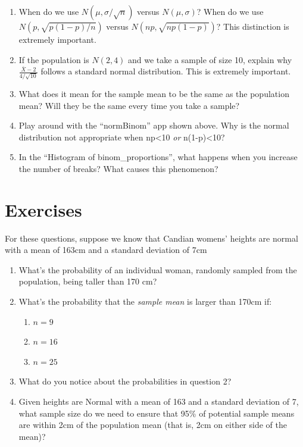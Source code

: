 \documentclass[
  letterpaper,
  DIV=11,
  numbers=noendperiod,
  oneside]{scrreprt}
\providecommand{\tightlist}{%
  \setlength{\itemsep}{0pt}\setlength{\parskip}{0pt}}\usepackage{longtable,booktabs,array}
\begin{document}
\begin{enumerate}
\def\labelenumi{\arabic{enumi}.}
\tightlist
\item
  When do we use \(N(\mu, \sigma/\sqrt{n})\) versus \(N(\mu, \sigma)\)?
  When do we use \(N(p, \sqrt{p(1-p)/n})\) versus
  \(N(np, \sqrt{np(1-p)})\)? This distinction is extremely important.
\item
  If the population is \(N(2,4)\) and we take a sample of size 10,
  explain why \(\frac{\bar X - 2}{4/\sqrt{10}}\) follows a standard
  normal distribution. This is extremely important.
\item
  What does it mean for the sample mean to be the same as the population
  mean? Will they be the same every time you take a sample?
\item
  Play around with the ``normBinom'' app shown above. Why is the normal
  distribution not appropriate when np\textless10 \emph{or}
  n(1-p)\textless10?
\item
  In the ``Histogram of binom\_proportions'', what happens when you
  increase the number of breaks? What causes this phenomenon?
\end{enumerate}

\hypertarget{exercises-2}{%
\section{Exercises}\label{exercises-2}}

For these questions, suppose we know that Candian womens' heights are
normal with a mean of 163cm and a standard deviation of 7cm

\begin{enumerate}
\def\labelenumi{\arabic{enumi}.}
\tightlist
\item
  What's the probability of an individual woman, randomly sampled from
  the population, being taller than 170 cm?
\item
  What's the probability that the \emph{sample mean} is larger than
  170cm if:

  \begin{enumerate}
  \def\labelenumii{\alph{enumii}.}
  \tightlist
  \item
    \(n = 9\)
  \item
    \(n = 16\)
  \item
    \(n = 25\)
  \end{enumerate}
\item
  What do you notice about the probabilities in question 2?
\item
  Given heights are Normal with a mean of 163 and a standard deviation
  of 7, what sample size do we need to ensure that 95\% of potential
  sample means are within 2cm of the population mean (that is, 2cm on
  either side of the mean)?
\end{enumerate}
\end{document}

